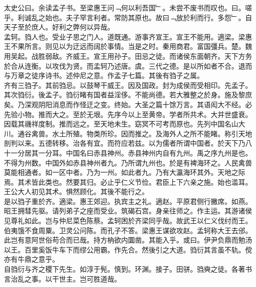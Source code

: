 \documentclass{zhvt-classic}
\begin{document}

\hspace*{2em}太史公曰。余读孟子书。至梁惠王问﹁何以利吾国﹂。未尝不废书而叹也。曰。嗟乎。利诚乱之始也。夫子罕言利者。常防其原也。故曰﹁放於利而行。多怨﹂。自天子至於庶人。好利之弊何以异哉。\\
\hspace*{2em}孟轲。驺人也。受业子思之门人。道既通。游事齐宣王。宣王不能用。適梁。梁惠王不果所言。则见以为迂远而阔於事情。当是之时。秦用商君。富国彊兵。楚。魏用吴起。战胜弱敌。齐威王。宣王用孙子。田忌之徒。而诸侯东面朝齐。天下方务於合从连衡。以攻伐为贤。而孟轲乃述唐。虞。三代之德。是以所如者不合。退而与万章之徒序诗书。述仲尼之意。作孟子七篇。其後有驺子之属。\\
\hspace*{2em}齐有三驺子。其前驺忌。以鼓琴干威王。因及国政。封为成侯而受相印。先孟子。\\
\hspace*{2em}其次驺衍。後孟子。驺衍睹有国者益淫侈。不能尚德。若大雅整之於身。施及黎庶矣。乃深观阴阳消息而作怪迂之变。终始。大圣之篇十馀万言。其语闳大不经。必先验小物。推而大之。至於无垠。先序今以上至黄帝。学者所共术。大并世盛衰。因载其禨祥度制。推而远之。至天地未生。窈冥不可考而原也。先列中国名山大川。通谷禽兽。水土所殖。物类所珍。因而推之。及海外人之所不能睹。称引天地剖判以来。五德转移。治各有宜。而符应若兹。以为儒者所谓中国者。於天下乃八十一分居其一分耳。中国名曰赤县神州。赤县神州内自有九州。禹之序九州是也。不得为州数。中国外如赤县神州者九。乃所谓九州也。於是有裨海环之。人民禽兽莫能相通者。如一区中者。乃为一州。如此者九。乃有大瀛海环其外。天地之际焉。其术皆此类也。然要其归。必止乎仁义节俭。君臣上下六亲之施。始也滥耳。王公大人初见其术。惧然顾化。其後不能行之。\\
\hspace*{2em}是以驺子重於齐。適梁。惠王郊迎。执宾主之礼。適赵。平原君侧行撇席。如燕。昭王拥彗先驱。请列弟子之座而受业。筑碣石宫。身亲往师之。作主运。其游诸侯见尊礼如此。岂与仲尼菜色陈蔡。孟轲困於齐梁同乎哉。故武王以仁义伐纣而王。伯夷饿不食周粟。卫灵公问陈。而孔子不答。梁惠王谋欲攻赵。孟轲称大王去邠。此岂有意阿世俗苟合而已哉。持方枘欲内圜凿。其能入乎。或曰。伊尹负鼎而勉汤以王。百里奚饭牛车下而缪公用霸。作先合。然後引之大道。驺衍其言虽不轨。傥亦有牛鼎之意乎。\\
\hspace*{2em}自驺衍与齐之稷下先生。如淳于髡。慎到。环渊。接子。田骈。驺奭之徒。各著书言治乱之事。以干世主。岂可胜道哉。\\
\end{document}
